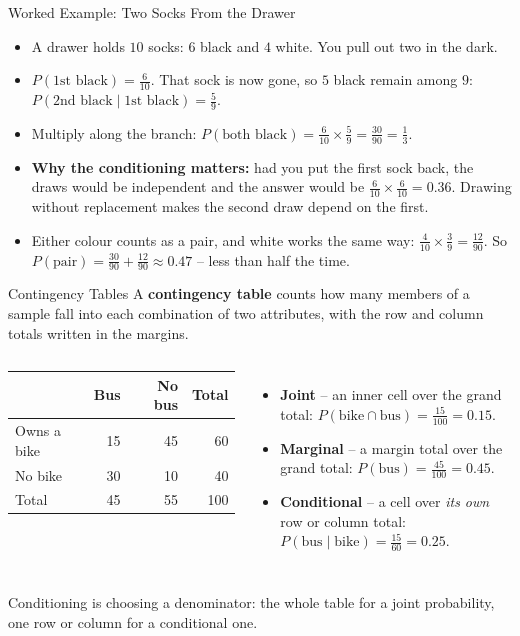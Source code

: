 \begin{frame}{Worked Example: Two Socks From the Drawer}
\begin{itemize}
  \item A drawer holds $10$ socks: $6$ black and $4$ white. You pull out two in the dark.
  \pause
  \item $P(\text{1st black}) = \tfrac{6}{10}$. That sock is now gone, so $5$ black remain among $9$: $P(\text{2nd black} \mid \text{1st black}) = \tfrac59$.
  \pause
  \item Multiply along the branch: $P(\text{both black}) = \tfrac{6}{10} \times \tfrac59 = \tfrac{30}{90} = \tfrac13$.
  \pause
  \item \textbf{Why the conditioning matters:} had you put the first sock back, the draws would be independent and the answer would be $\tfrac{6}{10} \times \tfrac{6}{10} = 0.36$. Drawing without replacement makes the second draw depend on the first.
  \pause
  \item Either colour counts as a pair, and white works the same way: $\tfrac{4}{10} \times \tfrac39 = \tfrac{12}{90}$. So $P(\text{pair}) = \tfrac{30}{90} + \tfrac{12}{90} \approx 0.47$ -- less than half the time.
\end{itemize}
\end{frame}

\begin{frame}{Contingency Tables}
\small
A \textbf{contingency table} counts how many members of a sample fall into each combination of two attributes, with the row and column totals written in the margins.
\vspace{0.4em}

\begin{columns}[T]
\centering
\small
\begin{tabular}{l|rr|r}
            & Bus & No bus & Total \\
\hline
Owns a bike & 15  & 45     & 60 \\
No bike     & 30  & 10     & 40 \\
\hline
Total       & 45  & 55     & 100 \\
\end{tabular}
\small
\begin{itemize}
  \item \textbf{Joint} -- an inner cell over the grand total: $P(\text{bike} \cap \text{bus}) = \tfrac{15}{100} = 0.15$.
  \pause
  \item \textbf{Marginal} -- a margin total over the grand total: $P(\text{bus}) = \tfrac{45}{100} = 0.45$.
  \pause
  \item \textbf{Conditional} -- a cell over \emph{its own} row or column total: $P(\text{bus} \mid \text{bike}) = \tfrac{15}{60} = 0.25$.
\end{itemize}
\end{columns}
\pause
\begin{rlintuition}
Conditioning is choosing a denominator: the whole table for a joint probability, one row or column for a conditional one.
\end{rlintuition}
\end{frame}

